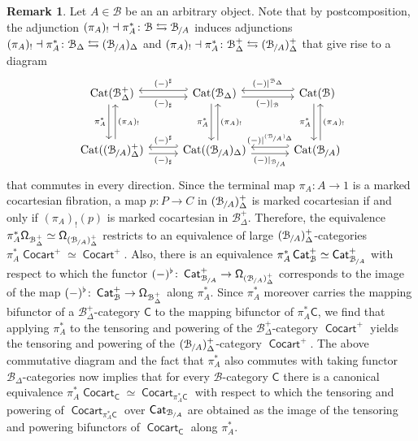 \documentclass[reqno]{amsart}
\numberwithin{equation}{subsection}
\theoremstyle{plain}
\theoremstyle{definition}
\newtheorem{remark}[equation]{Remark}
\let\scr=\mathcal
\def\BB{\scr B}
\DeclareMathOperator{\Cat}{Cat}
\DeclareMathOperator{\ICat}{\mathsf{Cat}}
\DeclareMathOperator{\ICocart}{\mathsf{Cocart}}
\newcommand{\Over}[2]{#1_{\hspace{-1pt}/#2}}
\newcommand{\I}[1]{\mathsf{#1}}
\newcommand{\Simp}[1]{#1_{\Delta}}
\newcommand{\mSimp}[1]{#1_{\Delta}^+}
\begin{document}
\begin{remark}
	\label{rem:BCCocart}
	Let $A\in\BB$ be an an arbitrary object. Note that by postcomposition, the adjunction $(\pi_A)_!\dashv\pi_A^\ast\colon \BB\leftrightarrows\Over{\BB}{A}$ induces adjunctions $(\pi_A)_!\dashv\pi_A^\ast\colon\Simp\BB\leftrightarrows\Simp{(\Over{\BB}{A})}$ and $(\pi_A)_!\dashv\pi_A^\ast\colon\mSimp\BB\leftrightarrows\mSimp{(\Over{\BB}{A})}$ that give rise to a diagram
	\begin{equation*}
	\begin{tikzcd}[column sep={9em,between origins}, row sep={5em,between origins}]
		\Cat(\mSimp\BB)\arrow[r, shift right=1mm, "(-)_\sharp"']\arrow[r, shift left=1mm, hookleftarrow, "(-)^\sharp"]\arrow[d, shift right=1mm, "\pi_A^\ast"']\arrow[from=d, shift right=1mm, "(\pi_A)_!"'] & \Cat(\Simp\BB)\arrow[r, shift right=1mm, "(-)\vert_\BB"']\arrow[r, shift left=1mm, hookleftarrow, "(-)\vert^{\Simp\BB}"] \arrow[d, shift right=1mm, "\pi_A^\ast"']\arrow[from=d, shift right=1mm, "(\pi_A)_!"']& \Cat(\BB)\arrow[d, shift right=1mm, "\pi_A^\ast"']\arrow[from=d, shift right=1mm, "(\pi_A)_!"'] \\
		\Cat(\mSimp{(\Over{\BB}{A})})\arrow[r, shift right=1mm, "(-)_\sharp"']\arrow[r, shift left=1mm, hookleftarrow, "(-)^\sharp"]& \Cat(\Simp{(\Over{\BB}{A})})\arrow[r, shift right=1mm, "(-)\vert_{\Over{\BB}{A}}"']\arrow[r, shift left=1mm, hookleftarrow, "(-)\vert^{\Simp{(\Over{\BB}{A})}}"] & \Cat(\Over{\BB}{A})
	\end{tikzcd}
	\end{equation*}
	that commutes in every direction.
	Since the terminal map $\pi_A\colon A\to 1$ is a marked cocartesian fibration, a map $p\colon P\to C$ in $\mSimp{(\Over{\BB}{A})}$ is marked cocartesian if and only if $(\pi_A)_!(p)$ is marked cocartesian in $\mSimp{\BB}$. Therefore, the equivalence $\pi_A^\ast\Univ[\mSimp\BB]\simeq\Univ[\mSimp{(\Over{\BB}{A})}]$ restricts to an equivalence of large $\mSimp{(\Over{\BB}{A})}$-categories $\pi_A^\ast\ICocart^+\simeq\ICocart^+$. Also, there is an equivalence $\pi_A^\ast\ICat_{\BB}^+\simeq\ICat_{\Over{\BB}{A}}^+$ with respect to which the functor $(-)^\flat\colon\ICat_{\Over{\BB}{A}}^+\to \Univ[\mSimp{(\Over{\BB}{A})}]$ corresponds to the image of the map $(-)^\flat\colon\ICat_{\BB}^+\to\Univ[\mSimp\BB]$ along $\pi_A^\ast$. Since $\pi_A^\ast$ moreover carries the mapping bifunctor of a $\mSimp\BB$-category $\I{C}$ to the mapping bifunctor of $\pi_A^\ast\I{C}$, we find that applying $\pi_A^\ast$ to the tensoring and powering of the $\mSimp\BB$-category $\ICocart^+$ yields the tensoring and powering of the $\mSimp{(\Over{\BB}{A})}$-category $\ICocart^+$. The above commutative diagram and the fact that $\pi_A^\ast$ also commutes with taking functor $\Simp\BB$-categories now implies that for every $\BB$-category $\I{C}$ there is a canonical equivalence $\pi_A^\ast\ICocart_{\I{C}}\simeq\ICocart_{\pi_A^\ast\I{C}}$ with respect to which the tensoring and powering of $\ICocart_{\pi_A^\ast\I{C}}$ over $\ICat_{\Over{\BB}{A}}$ are obtained as the image of the tensoring and powering bifunctors of $\ICocart_{\I{C}}$ along $\pi_A^\ast$.
\end{remark}
\end{document}
